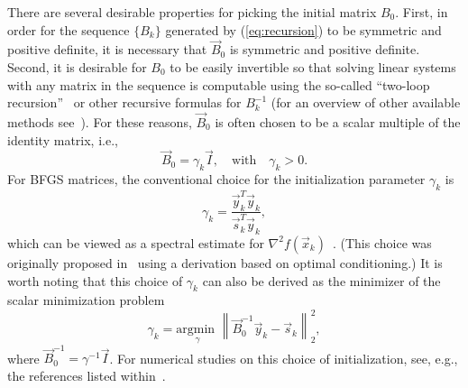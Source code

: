 There are several desirable properties for picking the initial matrix
$B_0$.  First, in order for the sequence $\{B_k\}$ generated by
(\ref{eq:recursion}) to be symmetric and positive definite, it is necessary
that $ \vec{B}_0 $ is symmetric and positive definite. Second, it is
desirable for $B_0$ to be easily invertible so that solving linear systems with any matrix
in the sequence is computable using the so-called ``two-loop
recursion''~\cite{ByrNS94} or other recursive formulas for $B_k^{-1}$ (for
an overview of other available methods see~\cite{ErwayMarcia17LAA}).  For
these reasons, $\vec{B}_0$ is often chosen to be a scalar multiple of the
identity matrix, i.e., 
\begin{equation}\label{eqn-diagInit}
	\vec{B}_0 =  \gamma_k \vec{I}, \quad
\text{with}\quad \gamma_k > 0. 
\end{equation}
For {\small BFGS} matrices, the conventional choice for the initialization parameter $ \gamma_k $ is 
\begin{equation}\label{eqn-B0-usual} \gamma_k = \frac{\vec{y}^T_{k}
  \vec{y}_{k} }{\vec{s}^T_{k} \vec{y}_{k}},
\end{equation} which can be viewed as a spectral
estimate for $\nabla^2 f( \vec{x}_k )$~\cite{NocW99}.
(This choice was originally proposed in~\cite{ShannoPh78} using a derivation
based on
optimal conditioning.)
It is worth noting that this choice of $ \gamma_k $ can also be derived as the minimizer
of the scalar minimization problem 
\begin{equation}\label{eqn-mingamma}
 \gamma_k = \underset{ \gamma }{ \text{
   argmin } } \left\| \vec{B}^{-1}_0 \vec{y}_k - \vec{s}_k \right\|^2_2,
\end{equation}
where $ \vec{B}^{-1}_0 = \gamma^{-1}\vec{I} $.
For numerical studies on this choice of initialization,
see, e.g., the references listed within~\cite{BurWX96}.

\bigskip

